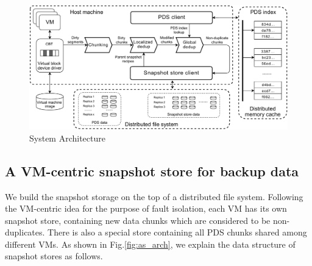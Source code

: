 \begin{figure}[t]
    \centering
    \includegraphics[width=6in]{images/socc_arch_cluster}
    \caption{System Architecture}
    \label{fig:arch_vm}
\end{figure}

\subsection{A VM-centric snapshot store for backup data}
\label{sect:store}
We build the snapshot storage on the top of a distributed file system.
Following the VM-centric idea for the purpose of fault isolation,
each VM has its own snapshot store, containing new data chunks which are considered
to be non-duplicates.
There is also a special store containing all PDS chunks shared among different VMs.
As shown in Fig.\ref{fig:as_arch}, we explain the data structure of snapshot stores as follows.

